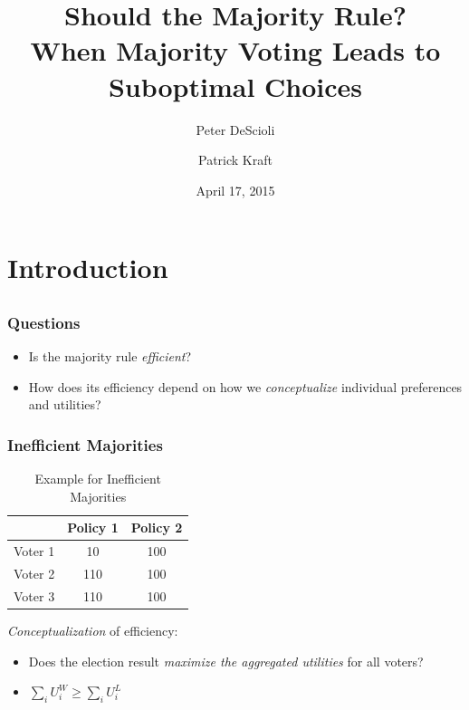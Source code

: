 \documentclass{beamer}
\author[DeScioli \& Kraft]{Peter DeScioli \and Patrick Kraft}
\institute[Stony Brook]{73rd MPSA Conference}
\title[Should the Majority Rule?]{Should the Majority Rule?\\{\small When Majority Voting Leads to Suboptimal Choices}}
\date{April 17, 2015}
\begin{document}
\frame{\titlepage}


\section{Introduction}

\subsection{}
\begin{frame}%
\frametitle{Questions}
\begin{itemize}
\item Is the majority rule \emph{efficient}?
\item How does its efficiency depend on how we \emph{conceptualize} individual preferences and utilities?
\end{itemize}
\end{frame}

\begin{frame}%
\frametitle{Inefficient Majorities}
\begin{table}[c]
  \caption{Example for Inefficient Majorities}
  \begin{center}
    \begin{tabular}{lcc}
    \hline
     & \textbf{Policy 1} & \textbf{Policy 2} \\
    \hline
       Voter 1 & 10 & 100 \\
       Voter 2 & 110 & 100 \\
       Voter 3 & 110 & 100 \\
    \hline
    \end{tabular}
  \end{center}
\end{table}
    \emph{Conceptualization} of efficiency:
    \begin{itemize}
      \item Does the election result \emph{maximize the aggregated utilities} for all voters?
      \item $ \sum_i U_i^{W} \geq \sum_i U_i^{L} $
    \end{itemize}
\end{frame}
\end{document}
